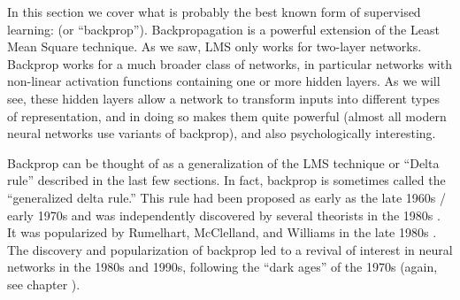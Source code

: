In this section we cover what is probably the best known form of supervised learning:  (or ``backprop''). Backpropagation is a powerful extension of the Least Mean Square  technique. As we saw, LMS only works for two-layer networks. Backprop works for a much broader class of networks, in particular networks with non-linear activation functions containing one or more hidden layers. As we will see, these hidden layers allow a network to transform inputs into different types of representation, and in doing so makes them quite powerful (almost all modern neural networks use variants of backprop), and also psychologically interesting. 

Backprop can be thought of as a generalization of the LMS technique or ``Delta rule'' described in the last few sections. In fact, backprop is sometimes called the ``generalized delta rule.'' This rule had been proposed as early as the late 1960s / early 1970s \cite{bryson1969applied, werbos1974beyond} and was independently discovered by several theorists in the 1980s \cite{le1986learning, parker1985learning}. It was popularized by Rumelhart, McClelland, and Williams in the late 1980s \cite{rumelhart1986parallel}. The discovery and popularization of backprop led to a revival of interest in neural networks in the 1980s and 1990s, following the ``dark ages'' of the 1970s (again, see chapter ).

